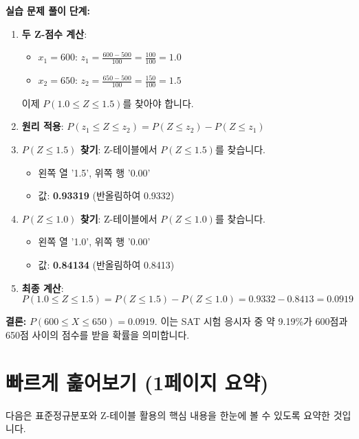 \documentclass[11pt,a4paper]{book}
\providecommand{\newsection}{\section}
\theoremstyle{definition}
\begin{document}
\begin{examplebox}
\textbf{실습 문제 풀이}
\textbf{단계:}
\begin{enumerate}
    \item \textbf{두 Z-점수 계산}:
    \begin{itemize}
        \item $x_1 = 600$: $z_1 = \frac{600 - 500}{100} = \frac{100}{100} = 1.0$
        \item $x_2 = 650$: $z_2 = \frac{650 - 500}{100} = \frac{150}{100} = 1.5$
    \end{itemize}
    이제 $P(1.0 \le Z \le 1.5)$를 찾아야 합니다.
    \item \textbf{원리 적용}: $P(z_1 \le Z \le z_2) = P(Z \le z_2) - P(Z \le z_1)$
    \item \textbf{$P(Z \le 1.5)$ 찾기}: Z-테이블에서 $P(Z \le 1.5)$를 찾습니다.
    \begin{itemize}
        \item 왼쪽 열 '1.5', 위쪽 행 '0.00'
        \item 값: \textbf{0.93319} (반올림하여 0.9332)
    \end{itemize}
    \item \textbf{$P(Z \le 1.0)$ 찾기}: Z-테이블에서 $P(Z \le 1.0)$를 찾습니다.
    \begin{itemize}
        \item 왼쪽 열 '1.0', 위쪽 행 '0.00'
        \item 값: \textbf{0.84134} (반올림하여 0.8413)
    \end{itemize}
    \item \textbf{최종 계산}:
    \[ P(1.0 \le Z \le 1.5) = P(Z \le 1.5) - P(Z \le 1.0) = 0.9332 - 0.8413 = 0.0919 \]
\end{enumerate}
\textbf{결론:} $P(600 \le X \le 650) = 0.0919$. 이는 SAT 시험 응시자 중 약 9.19\%가 600점과 650점 사이의 점수를 받을 확률을 의미합니다.
\end{examplebox}

\newsection*{빠르게 훑어보기 (1페이지 요약)}
다음은 표준정규분포와 Z-테이블 활용의 핵심 내용을 한눈에 볼 수 있도록 요약한 것입니다.
\end{document}
